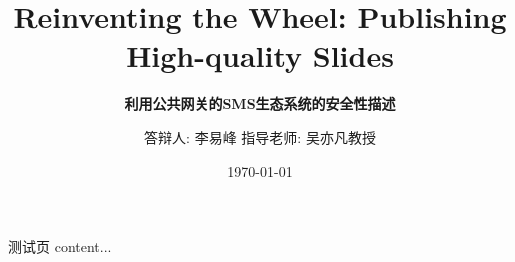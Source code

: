 \documentclass[10pt,aspectratio=43,mathserif]{beamer}
\title{Reinventing the Wheel: Publishing High-quality Slides}
\subtitle{\fontsize{9pt}{14pt}\textbf{利用公共网关的SMS生态系统的安全性描述}}
\author{答辩人: 李易峰 \newline \newline 指导老师: 吴亦凡教授}
\institute{中北大学英雄与联盟工程学院}
\date{\today}
\begin{document}
	\begin{frame}{测试页}
	content...
\end{frame}
\end{document}
